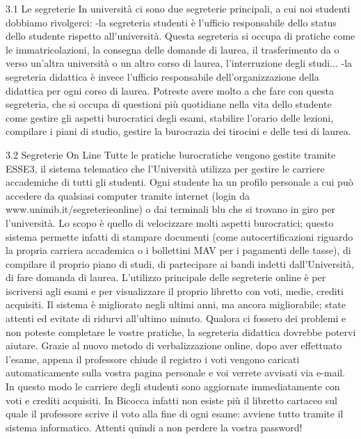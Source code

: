  3.1 Le segreterie
In università ci sono due segreterie principali, a cui noi studenti dobbiamo rivolgerci:
      -la segreteria studenti è l'ufficio responsabile dello status dello studente rispetto all'università. Questa segreteria si occupa di pratiche come le immatricolazioni, la consegna delle domande di laurea, il trasferimento da o verso un'altra università o un altro corso di laurea, l'interruzione degli studi...
      -la segreteria didattica è invece l'ufficio responsabile dell'organizzazione della didattica per ogni corso di laurea. Potreste avere molto a che fare con questa segreteria, che si occupa di questioni più quotidiane nella vita dello studente come gestire gli aspetti burocratici degli esami, stabilire l'orario delle lezioni, compilare i piani di studio, gestire la burocrazia dei tirocini e delle tesi di laurea.

3.2 Segreterie On Line
Tutte le pratiche burocratiche vengono gestite tramite ESSE3, il sistema telematico che l'Università utilizza per gestire le carriere accademiche di tutti gli studenti. 
Ogni studente ha un profilo personale a cui può accedere da qualsiasi computer tramite internet (login da www.unimib.it/segreterieonline) o dai terminali blu che si trovano in giro per l'università. Lo scopo è quello di velocizzare molti aspetti burocratici; questo sistema permette infatti di stampare documenti (come autocertificazioni riguardo la propria carriera accademica o i bollettini MAV per i pagamenti delle tasse), di compilare il proprio piano di studi, di partecipare ai bandi indetti dall'Università, di fare domanda di laurea. L'utilizzo principale delle segreterie online è per iscriversi agli esami e per visualizzare il proprio libretto con voti, medie, crediti acquisiti. 
Il sistema è migliorato negli ultimi anni, ma ancora migliorabile; state attenti ed evitate di ridurvi all'ultimo minuto. Qualora ci fossero dei problemi e non poteste completare le vostre pratiche, la segreteria didattica dovrebbe potervi aiutare.
Grazie al nuovo metodo di verbalizzazione online, dopo aver effettuato l'esame, appena il professore chiude il registro i voti vengono caricati automaticamente sulla vostra pagina personale e voi verrete avvisati via e-mail. In questo modo le carriere degli studenti sono aggiornate immediatamente con voti e crediti acquisiti. In Bicocca infatti non esiste più il libretto cartaceo sul quale il professore scrive il voto alla fine di ogni esame: avviene tutto tramite il sistema informatico.
Attenti quindi a non perdere la vostra password! 

